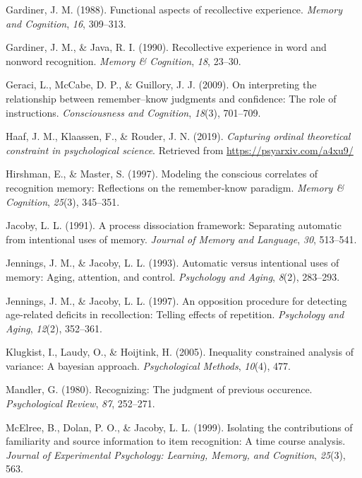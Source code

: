 \documentclass[english,,man,floatsintext]{apa6}
\begin{document}
\leavevmode\hypertarget{ref-Gardiner:1988}{}%
Gardiner, J. M. (1988). Functional aspects of recollective experience. \emph{Memory and Cognition}, \emph{16}, 309--313.

\leavevmode\hypertarget{ref-Gardiner:Java:1990}{}%
Gardiner, J. M., \& Java, R. I. (1990). Recollective experience in word and nonword recognition. \emph{Memory \& Cognition}, \emph{18}, 23--30.

\leavevmode\hypertarget{ref-Geraci:etal:2009}{}%
Geraci, L., McCabe, D. P., \& Guillory, J. J. (2009). On interpreting the relationship between remember--know judgments and confidence: The role of instructions. \emph{Consciousness and Cognition}, \emph{18}(3), 701--709.

\leavevmode\hypertarget{ref-Haaf:etal:2019}{}%
Haaf, J. M., Klaassen, F., \& Rouder, J. N. (2019). \emph{Capturing ordinal theoretical constraint in psychological science}. Retrieved from \url{https://psyarxiv.com/a4xu9/}

\leavevmode\hypertarget{ref-Hirshman:Master:1997}{}%
Hirshman, E., \& Master, S. (1997). Modeling the conscious correlates of recognition memory: Reflections on the remember-know paradigm. \emph{Memory \& Cognition}, \emph{25}(3), 345--351.

\leavevmode\hypertarget{ref-Jacoby:1991}{}%
Jacoby, L. L. (1991). A process dissociation framework: Separating automatic from intentional uses of memory. \emph{Journal of Memory and Language}, \emph{30}, 513--541.

\leavevmode\hypertarget{ref-Jennings:Jacoby:1993}{}%
Jennings, J. M., \& Jacoby, L. L. (1993). Automatic versus intentional uses of memory: Aging, attention, and control. \emph{Psychology and Aging}, \emph{8}(2), 283--293.

\leavevmode\hypertarget{ref-Jennings:Jacoby:1997}{}%
Jennings, J. M., \& Jacoby, L. L. (1997). An opposition procedure for detecting age-related deficits in recollection: Telling effects of repetition. \emph{Psychology and Aging}, \emph{12}(2), 352--361.

\leavevmode\hypertarget{ref-Klugkist:etal:2005}{}%
Klugkist, I., Laudy, O., \& Hoijtink, H. (2005). Inequality constrained analysis of variance: A bayesian approach. \emph{Psychological Methods}, \emph{10}(4), 477.

\leavevmode\hypertarget{ref-Mandler:1980}{}%
Mandler, G. (1980). Recognizing: The judgment of previous occurence. \emph{Psychological Review}, \emph{87}, 252--271.

\leavevmode\hypertarget{ref-McElree:etal:1999}{}%
McElree, B., Dolan, P. O., \& Jacoby, L. L. (1999). Isolating the contributions of familiarity and source information to item recognition: A time course analysis. \emph{Journal of Experimental Psychology: Learning, Memory, and Cognition}, \emph{25}(3), 563.
\end{document}
